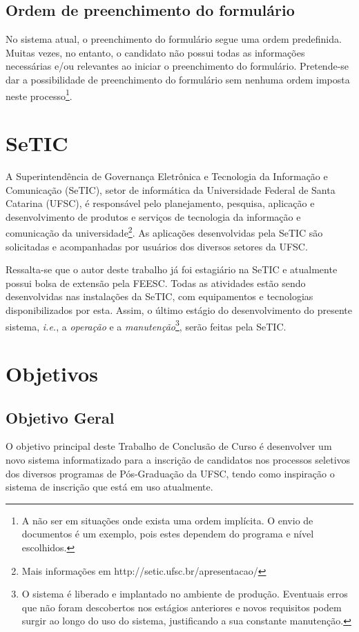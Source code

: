 \documentclass[
  10.5pt,				  %
	openright,			%
	twoside,			  %
  a5paper,
  chapter=TITLE,	%
	section=TITLE,	%
  hyphens,        %
	english,        %
	brazil          %
]{abntex2}
\begin{document}
\subsection{Ordem de preenchimento do formulário}
No sistema atual, o preenchimento do formulário segue uma ordem predefinida. Muitas vezes, no entanto, o candidato não possui todas as informações necessárias e/ou relevantes ao iniciar o preenchimento do formulário. Pretende-se dar a possibilidade de preenchimento do formulário sem nenhuma ordem imposta neste processo\footnote{A não ser em situações onde exista uma ordem implícita. O envio de documentos é um exemplo, pois estes dependem do programa e nível escolhidos.}.

\section{SeTIC}

A Superintendência de Governança Eletrônica e Tecnologia da Informação e Comunicação (SeTIC), setor de informática da Universidade Federal de Santa Catarina (UFSC), é responsável pelo planejamento, pesquisa, aplicação e desenvolvimento de produtos e serviços de tecnologia da informação e comunicação da universidade\footnote{Mais informações em http://setic.ufsc.br/apresentacao/}. As aplicações desenvolvidas pela SeTIC são solicitadas e acompanhadas por usuários dos diversos setores da UFSC.

Ressalta-se que o autor deste trabalho já foi estagiário na SeTIC e atualmente possui bolsa de extensão pela FEESC. Todas as atividades estão sendo desenvolvidas nas instalações da SeTIC, com equipamentos e tecnologias disponibilizados por esta. Assim, o último estágio do desenvolvimento do presente sistema, \emph{i.e.}, a \emph{operação} e a \emph{manutenção}\footnote{O sistema é liberado e implantado no ambiente de produção. Eventuais erros que não foram descobertos nos estágios anteriores e novos requisitos podem surgir ao longo do uso do sistema, justificando a sua constante manutenção.}, serão feitas pela SeTIC.

\section{Objetivos}

\subsection{Objetivo Geral}
O objetivo principal deste Trabalho de Conclusão de Curso é desenvolver um novo sistema informatizado para a inscrição de candidatos nos processos seletivos dos diversos programas de Pós-Graduação da UFSC, tendo como inspiração o sistema de inscrição que está em uso atualmente.
\end{document}

